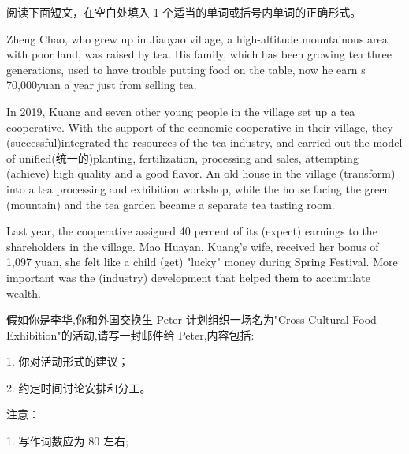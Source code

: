 \documentclass{英语试卷}
\begin{document}
\par 阅读下面短文，在空白处填入 1 个适当的单词或括号内单词的正确形式。\par
\par Zheng Chao, who grew up in Jiaoyao village, a high-altitude mountainous area with poor land, was raised by tea. His family, which has been growing tea  three generations, used to have trouble putting food on the table,  now he earn s 70,000yuan a year just from selling tea.\par
\par In 2019, Kuang and seven other young people in the village set up a tea cooperative. With the support of the economic cooperative in their village, they (successful)integrated the resources of the tea industry, and carried out the model of unified(统一的)planting, fertilization, processing and sales, attempting (achieve) high quality and a good flavor. An old house in the village (transform) into a tea processing and exhibition workshop, while the house facing the green (mountain) and the tea garden became a separate tea tasting room.\par
\par Last year, the cooperative assigned 40 percent of its  (expect) earnings to the shareholders in the village.  Mao Huayan, Kuang's wife, received her bonus of 1,097 yuan, she felt like a child (get) "lucky" money during Spring Festival. More important was the (industry) development that helped them to accumulate wealth.\par
{}
\par 假如你是李华,你和外国交换生 Peter 计划组织一场名为"Cross-Cultural Food Exhibition"的活动,请写一封邮件给 Peter,内容包括:\par
\par 1. 你对活动形式的建议；\par
\par 2. 约定时间讨论安排和分工。\par
\par 注意：\par
\par 1. 写作词数应为 80 左右;\par
\end{document}
